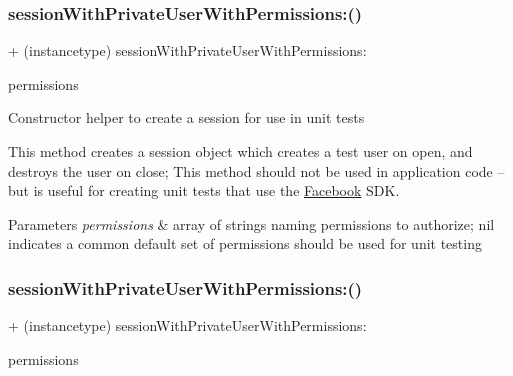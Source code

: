 \subsubsection{\texorpdfstring{session\+With\+Private\+User\+With\+Permissions\+:()}{sessionWithPrivateUserWithPermissions:()}\hspace{0.1cm}{\footnotesize\ttfamily [1/5]}}
{\footnotesize\ttfamily + (instancetype) session\+With\+Private\+User\+With\+Permissions\+: \begin{DoxyParamCaption}\item[{(N\+S\+Array $\ast$)}]{permissions }\end{DoxyParamCaption}}

Constructor helper to create a session for use in unit tests

This method creates a session object which creates a test user on open, and destroys the user on close; This method should not be used in application code -- but is useful for creating unit tests that use the \hyperlink{interfaceFacebook}{Facebook} S\+DK.


\begin{DoxyParams}{Parameters}
{\em permissions} & array of strings naming permissions to authorize; nil indicates a common default set of permissions should be used for unit testing \\
\hline
\end{DoxyParams}
\mbox{\label{interfaceFBTestSession_a435c3fc5a918dc5d0a4cfb05cf95e454}} 
\subsubsection{\texorpdfstring{session\+With\+Private\+User\+With\+Permissions\+:()}{sessionWithPrivateUserWithPermissions:()}\hspace{0.1cm}{\footnotesize\ttfamily [2/5]}}
{\footnotesize\ttfamily + (instancetype) session\+With\+Private\+User\+With\+Permissions\+: \begin{DoxyParamCaption}\item[{(N\+S\+Array $\ast$)}]{permissions }\end{DoxyParamCaption}}

